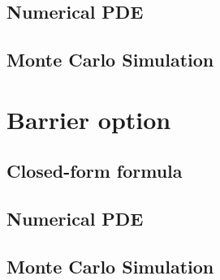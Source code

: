 \subsection{Numerical PDE}
\newpage
\subsection{Monte Carlo Simulation}
\newpage

\section{Barrier option}

\subsection{Closed-form formula}
\newpage
\subsection{Numerical PDE}
\newpage
\subsection{Monte Carlo Simulation}
\newpage

